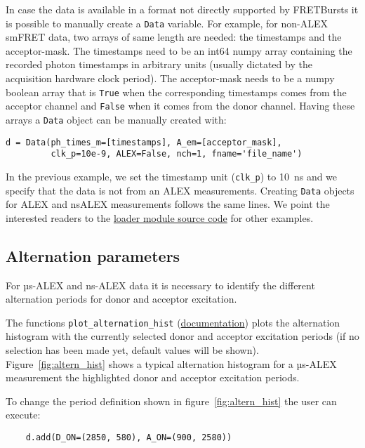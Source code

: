 In case the data is available in a format not directly supported by 
FRETBursts it is possible to manually create a \verb|Data| variable. 
For example, for non-ALEX smFRET data, two arrays of same length are 
needed: the timestamps and the acceptor-mask. The timestamps need to be 
an int64 numpy array containing the recorded photon timestamps in arbitrary 
units (usually dictated by the acquisition hardware clock period). 
The acceptor-mask needs to be a numpy boolean array that is \verb|True| 
when the corresponding timestamps comes from the acceptor channel and 
\verb|False| when it comes from the donor channel. Having these arrays a 
\verb|Data| object can be manually created with:

\begin{verbatim}
d = Data(ph_times_m=[timestamps], A_em=[acceptor_mask], 
         clk_p=10e-9, ALEX=False, nch=1, fname='file_name')
\end{verbatim}

In the previous example, we set the timestamp unit (\verb|clk_p|) to 10~ns 
and we specify that the data is not from an ALEX measurements. Creating 
\verb|Data| objects for ALEX and nsALEX measurements follows the same lines. 
We point the interested readers to the 
\href{https://github.com/tritemio/FRETBursts/blob/master/fretbursts/loader.py}{loader module source code} 
for other examples. 

\subsection{Alternation parameters}
\label{sec:alternation}

For µs-ALEX and ns-ALEX data it is necessary to identify the different 
alternation periods for donor and acceptor excitation.

The functions 
\verb|plot_alternation_hist| (\href{http://fretbursts.readthedocs.org/en/latest/plots.html#fretbursts.burst\_plot.plot\_alternation\_hist}{documentation})
plots the alternation histogram 
with the currently selected donor and acceptor excitation periods
(if no selection has been made yet, default values will be shown).
Figure~\ref{fig:altern_hist} shows a typical alternation histogram for
a µs-ALEX measurement the highlighted donor and acceptor excitation periods.

To change the period definition shown in figure~\ref{fig:altern_hist}
the user can execute:

\begin{verbatim}
    d.add(D_ON=(2850, 580), A_ON=(900, 2580))
\end{verbatim}

